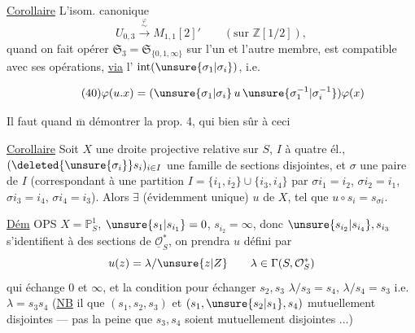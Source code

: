 \uline{Corollaire} L'isom. canonique
\[
U_{0,3}\xrightarrow{\overset{\varphi}{\sim}}M_{1,1}[2]'
\qquad (\text{sur }\mathbb Z[1/2]),
\]
quand on fait opérer $\mathfrak{S}_3=\mathfrak{S}_{\{0,1,\infty\}}$ sur
l'un et l'autre membre, est compatible
avec ses opérations, \uline{via} l' $\operatorname{int}(\unsure{\sigma_1|\sigma_i})$, i.e.


\[
\tag{40}
\varphi(u.x)=(\unsure{\sigma_1|\sigma_i}\,u\,\unsure{\sigma_1^{-1}|\sigma_i^{-1}})\varphi(x)
\]

Il faut quand $\overline{\mathrm m}$ démontrer la prop. 4,
qui  bien sûr à ceci

\uline{Corollaire} Soit $X$ une droite projective
relative sur  $S$, $I$  à quatre él.,
$(\deleted{\unsure{\sigma_i}}s_i)_{i\in I}$ une famille de sections 
disjointes, et $\sigma$ une  paire de
$I$ (correspondant à une partition $I=\{i_1,i_2\}\cup\{i_3,i_4\}$
par $\sigma i_1=i_2$, $\sigma i_2=i_1$, $\sigma i_3=i_4$, $\sigma i_4=i_3$). Alors $\exists$
 (évidemment unique) $u$ de $X$,
tel que $u\circ s_i=s_{\sigma i}$.

\uline{Dém} OPS $X=\mathbb P^1_S$, $\unsure{s_1|s_{i_1}}=0$, $s_{i_2}=\infty$, donc
$\unsure{s_{i_2}|s_{i_4}},s_{i_3}$ s'identifient à des sections de
$\underline{\mathcal O}_S^*$, on prendra  $u$ défini par
\[
u(z)=\lambda/\unsure{z|Z}\qquad\lambda\in\Gamma(S,\mathcal O_S^*)
\]
qui échange $0$ et $\infty$, et la condition
pour échanger $s_2,s_3$  $\lambda/s_3=s_4$, $\lambda/s_4=s_3$
i.e. $\lambda=s_3s_4$ (\uline{NB} il  que
$(s_1,s_2,s_3)$ et $(s_1,\unsure{s_2|s_1},s_4)$  mutuellement disjointes ---
pas la peine que $s_3,s_4$ soient mutuellement
disjointes $\ldots$)


